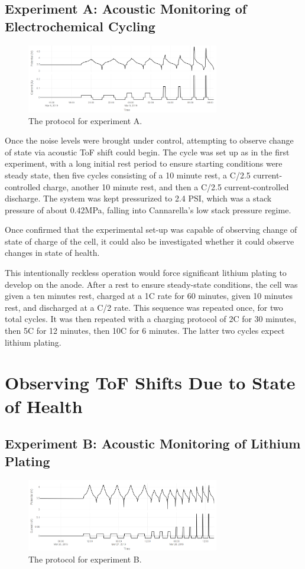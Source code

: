\subsection{Experiment A: Acoustic Monitoring of Electrochemical Cycling}
\begin{figure}[h!]\label{fig:neware0309}
    \includegraphics[width=0.75\textwidth]{Thesis/neware0309.PNG}
    \centering
    \caption{The protocol for experiment A.}
\end{figure}
Once the noise levels were brought under control, attempting to observe change of state via acoustic ToF shift could begin. The cycle was set up as in the first experiment, with a long initial rest period to ensure starting conditions were steady state, then five cycles consisting of a 10 minute rest, a C/2.5 current-controlled charge, another 10 minute rest, and then a C/2.5 current-controlled discharge. 
The system was kept pressurized to 2.4 PSI, which was a stack pressure of about 0.42MPa, falling into Cannarella's low stack pressure regime.

Once confirmed that the experimental set-up was capable of observing change of state of charge of the cell, it could also be investigated whether it could observe changes in state of health.

This intentionally reckless operation would force significant lithium plating to develop on the anode. 
After a rest to ensure steady-state conditions, the cell was given a ten minutes rest, charged at a 1C rate for 60 minutes, given 10 minutes rest, and discharged at a C/2 rate. 
This sequence was repeated once, for two total cycles. 
It was then repeated with a charging protocol of 2C for 30 minutes, then 5C for 12 minutes, then 10C for 6 minutes. 
The latter two cycles expect lithium plating.

\section{Observing ToF Shifts Due to State of Health} 
\subsection{Experiment B: Acoustic Monitoring of Lithium Plating}
\begin{figure}[h!]\label{fig:neware0325}
    \includegraphics[width=0.75\textwidth]{Thesis/neware0325.PNG}
    \centering
    \caption{The protocol for experiment B.}
\end{figure}

